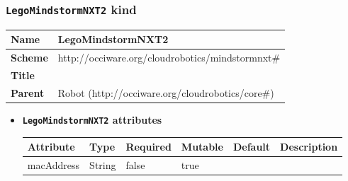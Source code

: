 \subsubsection{\texttt{LegoMindstormNXT2} kind}
\begin{center}
\begin{tabular}{|l|l|}
  \hline
  \textbf{Name} & LegoMindstormNXT2 \\
  \hline  
  \textbf{Scheme} & http://occiware.org/cloudrobotics/mindstormnxt\# \\
  \hline
  \textbf{Title} &  \\
  \hline
  \textbf{Parent} & Robot (http://occiware.org/cloudrobotics/core\#) \\
  \hline
\end{tabular}
\end{center}
\begin{itemize}
\item \textbf{\texttt{LegoMindstormNXT2} attributes}

\begin{tabularx}{\textwidth}{|l|l|p{1.4cm}|p{1.3cm}|l|X|}
  \hline
  \textbf{Attribute} & \textbf{Type} & \textbf{Required} & \textbf{Mutable} & \textbf{Default} & \textbf{Description} \\
  \hline  
  macAddress & String & false & true &  &  \\
  \hline
\end{tabularx}
\end{itemize}



